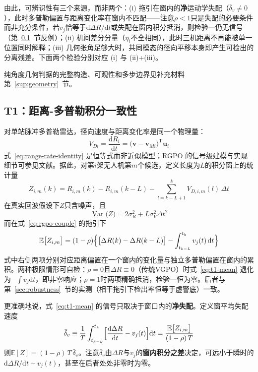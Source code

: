 \documentclass[UTF8,a4paper,zihao=-4]{ctexart}
\begin{document}
由此，可辨识性有三个来源，而非两个：(i) 拖引在窗内的\textbf{净}运动学失配（\(\bar\delta_v\neq0\)），此时多普勒偏置与距离变化率在窗内不匹配——注意\(\rho<1\)只是失配的必要条件而非充分条件，若\(v_j\)恰等于\(\mathrm{d}\Delta R/\mathrm{d}t\)或失配在窗内积分抵消，则检验一仍无信号（第~\ref{sec:t1}~节反例）；(ii) 机间差分分量（\(\eta_i\)不全相同），此时三机距离不再能被单一位置同时解释；(iii) 几何张角足够大时，共同模态的径向平移本身即产生可检出的分离残差。下面两个检验分别对应 (i) 与 (ii)+(iii)。


纯角度几何判据的完整构造、可观性和多步边界见补充材料第~\ref{sup:geometry}~节。



\subsection{T1：距离-多普勒积分一致性}\label{sec:t1}
对单站脉冲多普勒雷达，径向速度与距离变化率是同一个物理量：
\begin{equation}
V_{Di}=\frac{\mathrm{d}R_i}{\mathrm{d}t}=\bigl(\boldsymbol v-\boldsymbol v_{Mi}\bigr)^{\mathrm T}\boldsymbol u_i
\label{eq:range-rate-identity}
\end{equation}
式~\eqref{eq:range-rate-identity} 是恒等式而非近似模型\cite{skolnik2001}；RGPO 的信号级建模与实现细节可参见文献\cite{greco2006}。据此，对第\(i\)架无人机第\(m\)个候选，定义长度为\(L\)的积分窗上的统计量
\begin{equation}
Z_{i,m}(k)=R_{i,m}(k)-R_{i,m}(k-L)-\sum_{l=k-L+1}^{k}V_{D,i,m}(l)\,\Delta t
\label{eq:t1-stat}
\end{equation}
在真实回波假设下\(Z\)只含噪声，且
\begin{equation}
\operatorname{Var}\bigl(Z\bigr)=2\sigma_R^2+L\sigma_V^2\Delta t^2
\label{eq:t1-var}
\end{equation}
而在式~\eqref{eq:rgpo-couple} 的拖引下
\begin{equation}
\mathbb E\bigl[Z_{i,m}\bigr]=(1-\rho)\Bigl\{\bigl[\Delta R(k)-\Delta R(k-L)\bigr]-\int_{t_{k-L}}^{t_k}v_j(t)\,\mathrm dt\Bigr\}
\label{eq:t1-mean}
\end{equation}
式中右侧两项分别对应距离偏置在一个窗内的变化量与独立多普勒偏置在窗内的累积。两种极限情形可自检：\(\rho=0\)且\(\Delta R\equiv0\)（传统VGPO）时式~\eqref{eq:t1-mean} 退化为\(-\int v_j\mathrm dt\)，即非零响应；\(\rho=1\)时两项精确抵消，检验一恒为零。后者与第~\ref{sec:robustness}~节的实测（相干拖引下检出率恒等于虚警底）一致。

更准确地说，式~\eqref{eq:t1-mean} 的信号只取决于窗口内的\textbf{净失配}。定义窗平均失配速度
\begin{equation}
\bar\delta_v\equiv\frac1T\int_{t_{k-L}}^{t_k}\Bigl[\frac{\mathrm{d}\Delta R}{\mathrm{d}t}-v_j(t)\Bigr]\mathrm{d}t
=\frac{\mathbb E\bigl[Z_{i,m}\bigr]}{(1-\rho)\,T}
\label{eq:t1-deltabar}
\end{equation}
则\(\mathbb E[Z]=(1-\rho)\,T\,\bar\delta_v\)。注意\(\bar\delta_v\)由\(\Delta R\)与\(v_j\)的\textbf{窗内积分之差}决定，可远小于瞬时的\(\mathrm{d}\Delta R/\mathrm{d}t-v_j(t)\)，甚至在后者处处非零时为零。
\end{document}
